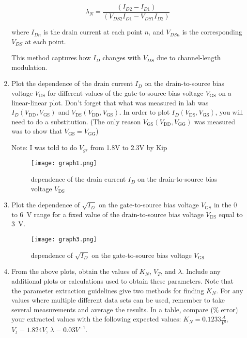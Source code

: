 \documentclass[12pt]{article}
\begin{document}
\begin{enumerate}
\[
\lambda_N = \frac{(I_{D2} - I_{D1})}{(V_{DS2}I_{D1} - V_{DS1}I_{D2})}
\]

where 
\( I_{Dn} \) is the drain current at each point \( n \), and
\( V_{DSn} \) is the corresponding \( V_{DS} \) at each point. 

This method captures how \( I_D \) changes with \( V_{DS} \) due to channel-length modulation.

\item Plot the dependence of the drain current $I_{D}$ on the drain-to-source bias voltage $V_{\mathrm{DS}}$ for different values of the gate-to-source bias voltage $V_{\mathrm{GS}}$ on a linear-linear plot. Don't forget that what was measured in lab was $I_D(V_{\mathrm{DD}}, V_{\mathrm{GS}})$ and $V_{\mathrm{DS}}(V_{\mathrm{DD}}, V_{\mathrm{GS}})$. In order to plot $I_D(V_{\mathrm{DS}}, V_{\mathrm{GS}})$, you will need to do a substitution. (The only reason $V_{\mathrm{GS}}(V_{\mathrm{DD}}, V_{\mathrm{GG}})$ was measured was to show that $V_{\mathrm{GS}} = V_{\mathrm{GG}}$)

Note: I was told to do $V_{gs}$ from 1.8V to 2.3V by Kip

\begin{figure}[h]
    \centering
    \texttt{[image: graph1.png]}
    \caption{dependence of the drain current $I_{D}$ on the drain-to-source bias voltage $V_{\mathrm{DS}}$}
    \label{fig:graph1}
\end{figure}


\item Plot the dependence of $\sqrt{I_D}$ on the gate-to-source bias voltage $ V_{\mathrm{GS}}$ in the 0 to \SI{6}{\volt} range for a fixed value of the drain-to-source bias voltage $V_{\mathrm{DS}}$ equal to \SI{3}{\volt}.

\begin{figure}[h]
    \centering
    \texttt{[image: graph3.png]}
    \caption{dependence of $\sqrt{I_D}$ on the gate-to-source bias voltage $ V_{\mathrm{GS}}$}
    \label{fig:graph2}
\end{figure}

\item From the above plots, obtain the values of $K_N$, $V_T$, and $\lambda$. Include any additional plots or calculations used to obtain these parameters. Note that the parameter extraction guidelines give two methods for finding $K_N$. For any values where multiple different data sets can be used, remember to take several measurements and average the results. In a table, compare (\% error) your extracted values with the following expected values: $K_N=0.1233\frac{A}{V^2}$, $V_t=1.824V$, $\lambda=0.03V^{-1}$.


\end{enumerate}
\end{document}
